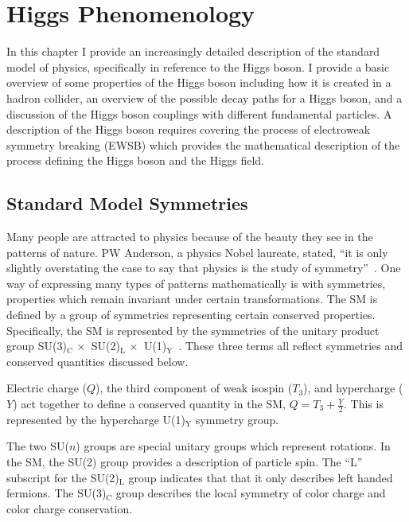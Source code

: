 \chapter{Higgs Phenomenology}
\label{sec:pheno}


In this chapter I provide an increasingly detailed description of the standard model
of physics, specifically in reference to the Higgs boson. I provide a basic overview of some 
properties of the Higgs boson including how it is created in a hadron collider, an overview
of the possible decay paths for a Higgs boson, and a discussion of the Higgs boson
couplings with different fundamental particles. A description of the
Higgs boson requires covering the process of electroweak symmetry breaking (EWSB) which
provides the mathematical description of the process defining the Higgs boson and the
Higgs field.

\section{Standard Model Symmetries}
Many people are attracted to physics because of the beauty they see in the patterns of nature.
PW Anderson, a physics Nobel laureate, stated, ``it is only slightly overstating the case 
to say that physics is the study of symmetry''~\cite{pw_anderson:1972}.
One way of expressing many types of patterns mathematically is with symmetries, properties which 
remain invariant under certain transformations. The SM is defined by a group of symmetries
representing certain conserved properties. Specifically, the SM is represented by  the
symmetries of the unitary product group SU(3)$_{\text{C}} \,\times \,$ SU(2)$_{\text{L}} \, 
\times\,$ U(1)$_{\text{Y}}$~\cite{SLANSKY19811}.
These three terms all reflect symmetries and conserved quantities discussed below.

Electric charge ($Q$), the third component of weak isospin ($T_{3}$), and hypercharge ($Y$) act together to define a conserved 
quantity in the SM, $Q = T_{3} + \frac{Y}{2}$. This is represented by the
hypercharge U(1)$_{\text{Y}}$ symmetry group.

The two SU($n$) groups are special unitary groups which represent rotations.
In the SM, the SU(2) group provides a description of particle spin.
The ``L'' subscript for the SU(2)$_{\text{L}}$ group indicates that that it
only describes left handed fermions.
The SU(3)$_{\text{C}}$ group describes the local symmetry of color charge and
color charge conservation.


